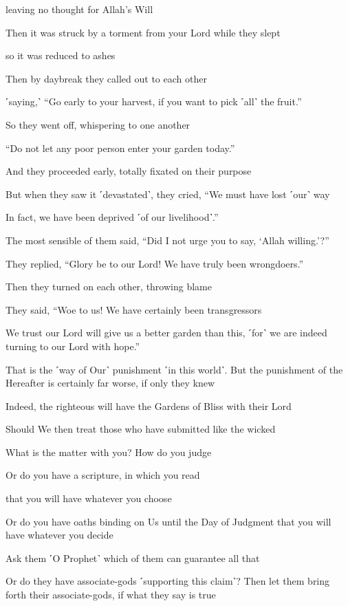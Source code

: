 leaving no thought for Allah’s Will

Then it was struck by a torment from your Lord while they slept

so it was reduced to ashes

Then by daybreak they called out to each other

˹saying,˺ “Go early to your harvest, if you want to pick ˹all˺ the fruit.”

So they went off, whispering to one another

“Do not let any poor person enter your garden today.”

And they proceeded early, totally fixated on their purpose

But when they saw it ˹devastated˺, they cried, “We must have lost ˹our˺ way

In fact, we have been deprived ˹of our livelihood˺.”

The most sensible of them said, “Did I not urge you to say, ‘Allah willing.’?”

They replied, “Glory be to our Lord! We have truly been wrongdoers.”

Then they turned on each other, throwing blame

They said, “Woe to us! We have certainly been transgressors

We trust our Lord will give us a better garden than this, ˹for˺ we are indeed turning to our Lord with hope.”

That is the ˹way of Our˺ punishment ˹in this world˺. But the punishment of the Hereafter is certainly far worse, if only they knew

Indeed, the righteous will have the Gardens of Bliss with their Lord

Should We then treat those who have submitted like the wicked

What is the matter with you? How do you judge

Or do you have a scripture, in which you read

that you will have whatever you choose

Or do you have oaths binding on Us until the Day of Judgment that you will have whatever you decide

Ask them ˹O Prophet˺ which of them can guarantee all that

Or do they have associate-gods ˹supporting this claim˺? Then let them bring forth their associate-gods, if what they say is true

